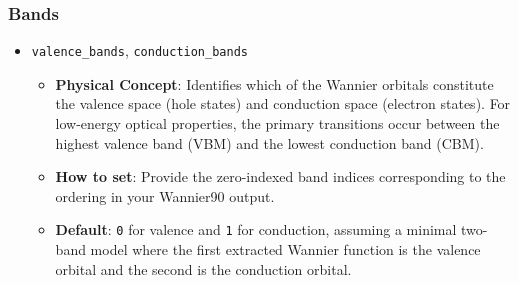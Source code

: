 \documentclass[11pt, a4paper]{article}
\begin{document}
\subsubsection{Bands}
\begin{itemize}
    \item \texttt{valence\_bands}, \texttt{conduction\_bands}
    \begin{itemize}
        \item \textbf{Physical Concept}: Identifies which of the Wannier orbitals constitute the valence space (hole states) and conduction space (electron states). For low-energy optical properties, the primary transitions occur between the highest valence band (VBM) and the lowest conduction band (CBM).
        \item \textbf{How to set}: Provide the zero-indexed band indices corresponding to the ordering in your Wannier90 output.
        \item \textbf{Default}: \texttt{0} for valence and \texttt{1} for conduction, assuming a minimal two-band model where the first extracted Wannier function is the valence orbital and the second is the conduction orbital.
    \end{itemize}
\end{itemize}
\end{document}

